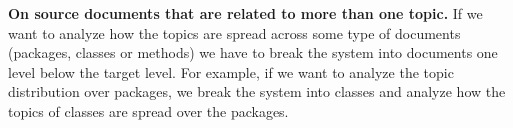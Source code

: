 \textbf{On source documents that are related to more than one topic.} If we want to analyze how the topics are spread across some type of documents (\eg packages, classes or methods) we have to break the system into documents one level below the target level. For example, if we want to analyze the topic distribution over packages, we break the system into classes and analyze how the topics of classes are spread over the packages.

%
%
%
%

